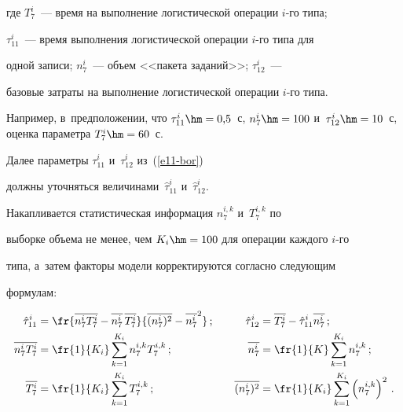       


      \noindent


где $T_7^i$~--- время на выполнение логистической операции $i$-го типа; 


$\tau^i_{11}$~--- время выполнения логистической операции $i$-го типа для 


одной записи; $n_7^i$~--- объем <<пакета заданий>>; $\tau^i_{12}$~--- 


базовые затраты на выполнение логистической операции $i$-го типа. 


Например, в~предположении, что $\tau_{11}^i\hm= 0{,}5$~с, $n_7^i\hm = 


100$ и~$\tau^i_{12}\hm = 10$~с, оценка параметра $T_7^i\hm = 60$~с.





      Далее параметры $\tau^i_{11}$ и~$\tau^i_{12}$ из~(\ref{e11-bor}) 


должны уточняться величинами~$\hat{\tau}^i_{11}$ и~$\hat{\tau}^i_{12}$. 


Накапливается статистическая информация $n_7^{i,k}$ и~$T_7^{i,k}$ по 


выборке объема не менее, чем $K_i\hm=100$ для операции каждого $i$-го 


типа, а~затем факторы модели корректируются согласно следующим 


формулам:





\noindent


      \begin{alignat*}{2}


                \displaystyle  


          \hat{\tau}^i_{11}&=\fr{\overline{n_7^i T_7^i} -\overline{n_7^i}\, 


\overline{T_7^i}}{\overline{(n_7^i)^2}-\overline{n_7^i}^2}\,;&\quad


\hat{\tau}^i_{12}&=\overline{T_7^i} -\hat{\tau}^i_{11} 


\overline{n_7^i}\,;\\


      \overline{n_7^i T_7^i}&=\fr{1}{K_i}\sum\limits_{k=1}^{K_i} n_7^{i,k} 


T_7^{i,k}\,;&\quad \overline{n_7^i}&=\fr{1}{K}\sum\limits_{k=1}^{K_i} 


n_7^{i,k}\,;\\


\displaystyle  \overline{T_7^i} &=\fr{1}{K_i} \sum\limits_{k=1}^{K_i} 


T_7^{i,k}\,;&\quad \overline{(n_7^i)^2} &=\fr{1}{K_i} \sum\limits_{k=1}^{K_i} 


\left( n_7^{i,k}\right)^2\,.




      \end{alignat*}


